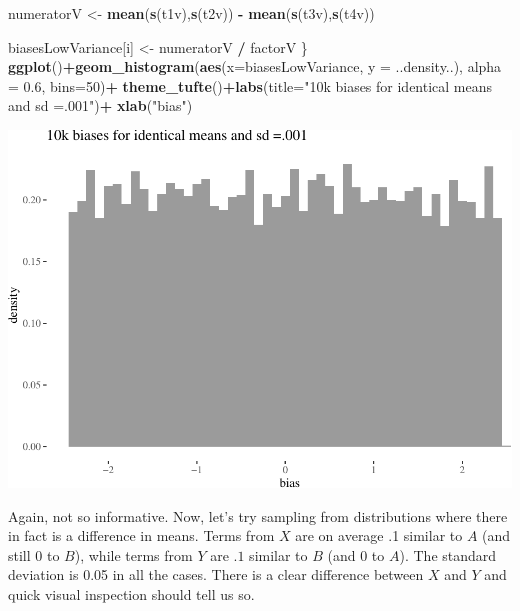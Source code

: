 \documentclass[10pt,dvipsnames,enabledeprecatedfontcommands]{scrartcl}
\newenvironment{Shaded}{\begin{snugshade}}{\end{snugshade}}
\newcommand{\KeywordTok}[1]{\textcolor[rgb]{0.13,0.29,0.53}{\textbf{#1}}}
\newcommand{\DataTypeTok}[1]{\textcolor[rgb]{0.13,0.29,0.53}{#1}}
\newcommand{\DecValTok}[1]{\textcolor[rgb]{0.00,0.00,0.81}{#1}}
\newcommand{\FloatTok}[1]{\textcolor[rgb]{0.00,0.00,0.81}{#1}}
\newcommand{\StringTok}[1]{\textcolor[rgb]{0.31,0.60,0.02}{#1}}
\newcommand{\OperatorTok}[1]{\textcolor[rgb]{0.81,0.36,0.00}{\textbf{#1}}}
\newcommand{\NormalTok}[1]{#1}
\begin{document}
\begin{Shaded}
\begin{Highlighting}[]
\NormalTok{numeratorV <-}\StringTok{  }\KeywordTok{mean}\NormalTok{(}\KeywordTok{s}\NormalTok{(t1v),}\KeywordTok{s}\NormalTok{(t2v)) }\OperatorTok{-}\StringTok{ }\KeywordTok{mean}\NormalTok{(}\KeywordTok{s}\NormalTok{(t3v),}\KeywordTok{s}\NormalTok{(t4v))}

\NormalTok{biasesLowVariance[i] <-}\StringTok{ }\NormalTok{numeratorV }\OperatorTok{/}\StringTok{ }\NormalTok{factorV}
\NormalTok{\}}
\KeywordTok{ggplot}\NormalTok{()}\OperatorTok{+}\KeywordTok{geom_histogram}\NormalTok{(}\KeywordTok{aes}\NormalTok{(}\DataTypeTok{x=}\NormalTok{biasesLowVariance, }\DataTypeTok{y =}\NormalTok{ ..density..), }\DataTypeTok{alpha =} \FloatTok{0.6}\NormalTok{, }\DataTypeTok{bins=}\DecValTok{50}\NormalTok{)}\OperatorTok{+}
\StringTok{  }\KeywordTok{theme_tufte}\NormalTok{()}\OperatorTok{+}\KeywordTok{labs}\NormalTok{(}\DataTypeTok{title=}\StringTok{"10k biases for identical means and sd =.001"}\NormalTok{)}\OperatorTok{+}\StringTok{ }\KeywordTok{xlab}\NormalTok{(}\StringTok{"bias"}\NormalTok{)}
\end{Highlighting}
\end{Shaded}

\begin{center}\includegraphics[width=1\linewidth]{paperDraft_files/figure-latex/unnamed-chunk-8-1} \end{center}

\normalsize

Again, not so informative. Now, let's try sampling from distributions
where there in fact is a difference in means. Terms from \(X\) are on
average .1 similar to \(A\) (and still \(0\) to \(B\)), while terms from
\(Y\) are \(.1\) similar to \(B\) (and 0 to \(A\)). The standard
deviation is 0.05 in all the cases. There is a clear difference between
\(X\) and \(Y\) and quick visual inspection should tell us so.
\end{document}
